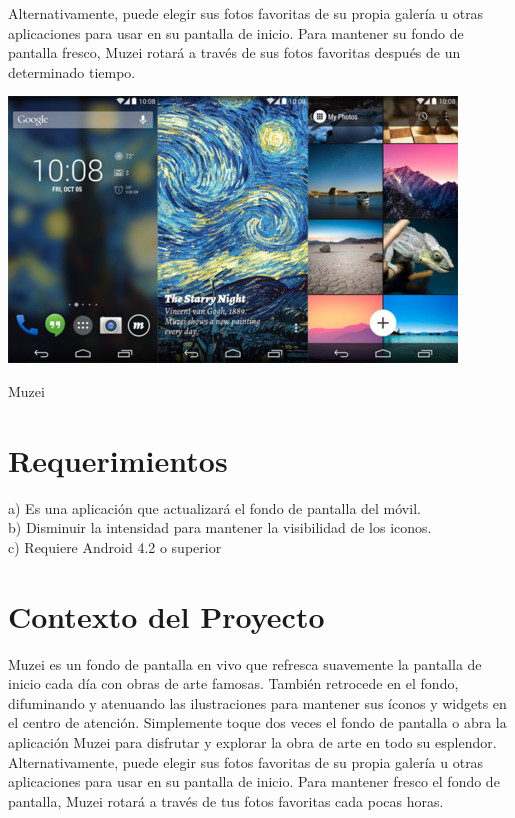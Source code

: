 \documentclass[12pt,a4paper]{article}
\begin{document}
Alternativamente, puede elegir sus fotos favoritas de su propia galería u otras aplicaciones para usar en su pantalla de inicio. Para mantener su fondo de pantalla fresco, Muzei rotará a través de sus fotos favoritas después de un determinado tiempo.\\

\begin{Imagen}
\centering
\includegraphics[scale=0.9]{Imagen.jpg}
\caption{Muzei}
\end{Imagen}

\section{Requerimientos}
a)	Es una aplicación que actualizará el fondo de pantalla del móvil.\\
b)	Disminuir la intensidad para mantener la visibilidad de los iconos.\\
c)	Requiere Android 4.2 o superior\\

\section{Contexto del Proyecto}

Muzei es un fondo de pantalla en vivo que refresca suavemente la pantalla de inicio cada día con obras de arte famosas. También retrocede en el fondo, difuminando y atenuando las ilustraciones para mantener sus íconos y widgets en el centro de atención. Simplemente toque dos veces el fondo de pantalla o abra la aplicación Muzei para disfrutar y explorar la obra de arte en todo su esplendor.\\

Alternativamente, puede elegir sus fotos favoritas de su propia galería u otras aplicaciones para usar en su pantalla de inicio. Para mantener fresco el fondo de pantalla, Muzei rotará a través de tus fotos favoritas cada pocas horas.\\
\end{document}
